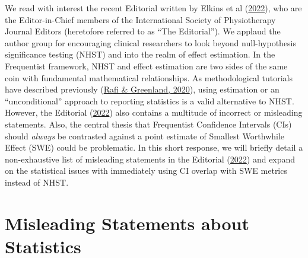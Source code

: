 \documentclass[]{cik}%
\begin{document}
\providecommand{\tightlist}{%
  \setlength{\itemsep}{0pt}\setlength{\parskip}{0pt}}
\providecommand{\EndFirstPage}{%
}


\maketitle

\newpage

\newpage

We read with interest the recent Editorial written by Elkins et al
(\protect\hyperlink{ref-elkins2022}{2022}), who are the Editor-in-Chief
members of the International Society of Physiotherapy Journal Editors
(heretofore referred to as ``The Editorial''). We applaud the author
group for encouraging clinical researchers to look beyond
null-hypothesis significance testing (NHST) and into the realm of effect
estimation. In the Frequentist framework, NHST and effect estimation are
two sides of the same coin with fundamental mathematical relationships.
As methodological tutorials have described previously
(\protect\hyperlink{ref-rafi2020}{Rafi \& Greenland, 2020}), using
estimation or an ``unconditional'' approach to reporting statistics is a
valid alternative to NHST. However, the Editorial
(\protect\hyperlink{ref-elkins2022}{2022}) also contains a multitude of
incorrect or misleading statements. Also, the central thesis that
Frequentist Confidence Intervals (CIs) should \emph{always} be
contrasted against a point estimate of Smallest Worthwhile Effect (SWE)
could be problematic. In this short response, we will briefly detail a
non-exhaustive list of misleading statements in the Editorial
(\protect\hyperlink{ref-elkins2022}{2022}) and expand on the statistical
issues with immediately using CI overlap with SWE metrics instead of
NHST.

\hypertarget{misleading-statements-about-statistics}{%
\section{Misleading Statements about
Statistics}\label{misleading-statements-about-statistics}}
\end{document}

